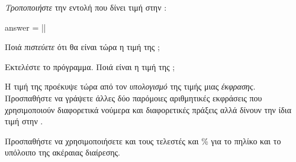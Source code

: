 \documentclass[a4paper,11pt,oneside]{book}
\begin{document}

\begin{step}
\label{step:answer-compute}
\emph{Τροποποιήστε} την εντολή που δίνει τιμή στην :

\begin{pyplain}
answer = ||
\end{pyplain}

Ποιά \emph{πιστεύετε} ότι θα είναι τώρα η τιμή της ;

\dottedline

Εκτελέστε το πρόγραμμα. Ποιά είναι η τιμή της ; 

\dottedline

Η τιμή της  προέκυψε τώρα από τον \emph{υπολογισμό} της τιμής μιας \emph{έκφρασης}. Προσπαθήστε να γράψετε άλλες δύο παρόμοιες αριθμητικές εκφράσεις που χρησιμοποιούν διαφορετικά νούμερα και διαφορετικές πράξεις αλλά δίνουν την ίδια τιμή στην .

\begin{note}
Προσπαθήστε να χρησιμοποιήσετε και τους τελεστές \pyinline{//} και \% για το πηλίκο και το υπόλοιπο της ακέραιας διαίρεσης.
\end{note}

\marginnote[14pt]{\icondiscuss}
\dottedline

\dottedline
\end{step}

\end{document}
